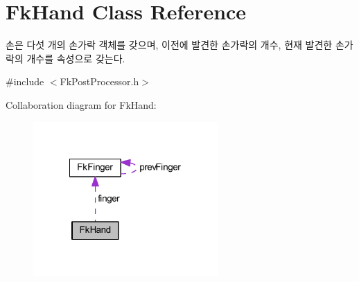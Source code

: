 \hypertarget{class_fk_hand}{}\section{Fk\+Hand Class Reference}
\label{class_fk_hand}


손은 다섯 개의 손가락 객체를 갖으며, 이전에 발견한 손가락의 개수, 현재 발견한 손가락의 개수를 속성으로 갖는다.  




{\ttfamily \#include $<$Fk\+Post\+Processor.\+h$>$}



Collaboration diagram for Fk\+Hand\+:
\nopagebreak
\begin{figure}[H]
\begin{center}
\leavevmode
\includegraphics[width=200pt]{class_fk_hand__coll__graph}
\end{center}
\end{figure}
